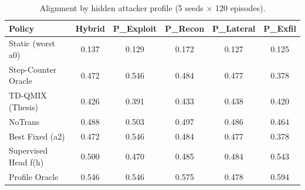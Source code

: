 \begin{table}[t]\centering
\caption{Alignment by hidden attacker profile (5 seeds $\times$ 120 episodes).}
\label{tab:profile}
\begin{tabular}{l c c c c c }
\hline
Policy & Hybrid & P\_Exploit & P\_Recon & P\_Lateral & P\_Exfil \\
\hline
Static (worst a0) & 0.137 & 0.129 & 0.172 & 0.127 & 0.125 \\
Step-Counter Oracle & 0.472 & 0.546 & 0.484 & 0.477 & 0.378 \\
TD-QMIX (Thesis) & 0.426 & 0.391 & 0.433 & 0.438 & 0.420 \\
NoTrans & 0.488 & 0.503 & 0.497 & 0.486 & 0.464 \\
Best Fixed (a2) & 0.472 & 0.546 & 0.484 & 0.477 & 0.378 \\
Supervised Head f(h) & 0.500 & 0.470 & 0.485 & 0.484 & 0.543 \\
Profile Oracle & 0.546 & 0.546 & 0.575 & 0.478 & 0.594 \\
\hline
\end{tabular}
\end{table}